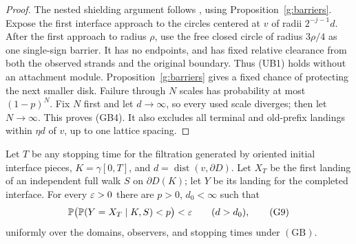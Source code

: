 \begin{proof}
The nested shielding argument follows \cite[Lemma~3.24]{SSdiscrete},
using Proposition~\ref{g:barriers}. Expose the first interface approach
to the circles centered at \(v\) of radii \(2^{-j-1}d\).
After the first approach to radius \(\rho\), use the free closed
circle of radius \(3\rho/4\) as one single-sign barrier.
It has no endpoints, and has fixed relative clearance from both
the observed strands and the original boundary. Thus (UB1) holds
without an attachment module. Proposition~\ref{g:barriers} gives a
fixed chance of protecting the next smaller disk. Failure through \(N\) scales
has probability at most \((1-p)^N\). Fix \(N\) first and let
\(d\to\infty\), so every used scale diverges; then let \(N\to\infty\).
This proves (GB4). It also excludes all terminal and old-prefix
landings within \(\eta d\) of \(v\), up to one lattice spacing.
\end{proof}

\begin{lemma}\label{g:survival}
Let \(T\) be any stopping time for the filtration generated by oriented
initial interface pieces, \(K=\gamma[0,T]\), and
\(d=\operatorname{dist}(v,\partial D)\). Let \(X_T\) be the first
landing of an independent full walk \(S\) on \(\partial D(K)\);
let \(Y\) be its landing for the completed interface. For every
\(\varepsilon>0\) there are \(p>0\), \(d_0<\infty\) such that
\[
 \mathbb P\bigl(\mathbb P(Y=X_T\mid K,S)<p\bigr)<\varepsilon
 \qquad(d>d_0),                                      \tag{G9}
\]
uniformly over the domains, observers, and stopping times under
\((\mathrm{GB})\).
\end{lemma}

